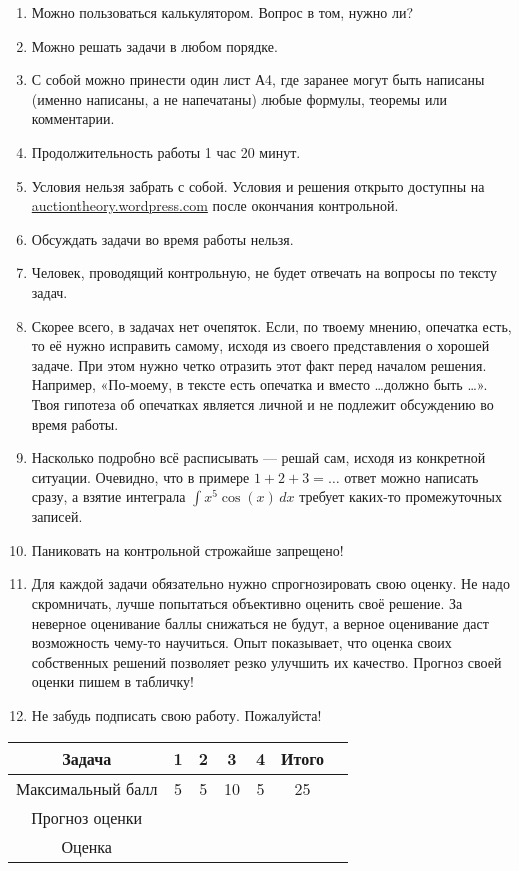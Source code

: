 \documentclass[11pt, openany]{book}
\numberwithin{equation}{page} %
\theoremstyle{definition} %
\theoremstyle{definition}
\theoremstyle{definition}
\begin{document}
\begin{enumerate}
\item Можно пользоваться калькулятором. Вопрос в том, нужно ли?
\item Можно решать задачи в любом порядке.
\item С собой можно принести один лист А4, где заранее могут быть написаны (именно написаны, а не напечатаны) любые формулы, теоремы или комментарии.
\item Продолжительность работы 1 час 20 минут.
\item Условия нельзя забрать с собой. Условия и решения открыто доступны на \url{auctiontheory.wordpress.com} после окончания контрольной.
\item Обсуждать задачи во время работы нельзя.
\item Человек, проводящий контрольную, не будет отвечать на вопросы по тексту задач.
\item Скорее всего, в задачах нет очепяток. Если, по твоему мнению, опечатка есть, то её нужно исправить самому, исходя из своего представления о хорошей задаче. При этом нужно четко отразить этот факт перед началом решения. Например, «По-моему, в тексте есть опечатка и вместо \ldots должно быть \ldots». Твоя гипотеза об опечатках является личной и не подлежит обсуждению во время работы.
\item Насколько подробно всё расписывать — решай сам, исходя из конкретной ситуации. Очевидно, что в примере $ 1+2+3=\ldots $ ответ можно написать сразу, а взятие интеграла $ \int x^{5}\cos(x)\, dx $ требует каких-то промежуточных записей.
\item Паниковать на контрольной строжайше запрещено!
\item Для каждой задачи обязательно нужно спрогнозировать свою оценку. Не надо скромничать, лучше попытаться объективно оценить своё решение.  За неверное оценивание баллы снижаться не будут, а верное оценивание даст возможность чему-то научиться. Опыт показывает, что оценка своих собственных решений позволяет резко улучшить их качество. Прогноз своей оценки пишем в табличку!
\item Не забудь подписать свою работу. Пожалуйста!

\end{enumerate}

\begin{tabular}{ccccccc}
\toprule
Задача & 1 & 2 & 3 & 4 & Итого \\
\midrule
Максимальный балл & 5 & 5 & 10 & 5 & 25 \\
Прогноз оценки &  &  &  &  &   \\
Оценка &  &  &  &  &   \\
\bottomrule
\end{tabular}
\newpage
\end{document}
